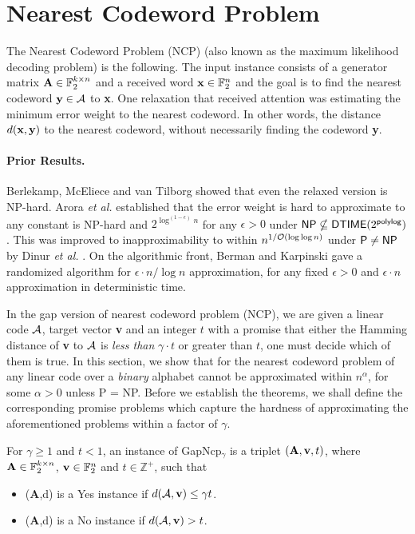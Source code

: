 \section{Nearest Codeword Problem} 

The Nearest Codeword Problem (NCP) (also known as the maximum
likelihood decoding problem) is the following.  The input instance
consists of a generator matrix ${\bf A} \in \mathbb{F}_2^{k \times n}$ and
a received word ${\bf x} \in \mathbb{F}^n_2$ and the goal is to find
the nearest codeword ${\bf y} \in {\cal A}$ to {\bf x}. One relaxation that
received attention was estimating the minimum error weight to the
nearest codeword. In other words, the distance $d({\bf x, y})$ to the
nearest codeword, without necessarily finding the codeword {\bf y}.

\paragraph{Prior Results.} Berlekamp, McEliece and van Tilborg
\cite{BMT} showed that even the relaxed version is {\sf
  NP}-hard. Arora {\em et al.} \cite{ABSS} established that the error
weight is hard to approximate to any constant is {\sf NP}-hard and
$2^{\log^{(1-\epsilon)}n}$ for any $\epsilon > 0$ under ${\sf NP}
\nsubseteq {\sf DTIME}(2^{\sf poly log})$. This was improved to
inapproximability to within $n^{1/{\cal O}(\log\log n)}$ under ${\sf
  P} \ne {\sf NP}$ by Dinur {\em et al.} \cite{DKRS}. On the
algorithmic front, Berman and Karpinski \cite{BK} gave a randomized
algorithm for $\epsilon\cdot n/\log n$ approximation, for any fixed $\epsilon >0$
and $\epsilon \cdot n$ approximation in deterministic time.


In the gap version of nearest codeword problem (NCP), we are given a
linear code {${\cal A}$}, target vector {\bf v} and an integer $t$ with a
promise that either the Hamming distance of {\bf v} to ${\cal A}$ is {\em
  less than} $\gamma \cdot t$ or greater than $t$, one must decide
which of them is true. In this section, we show that for the nearest
codeword problem of any linear code over a {\em binary} alphabet
cannot be approximated within $n^\alpha$, for some $\alpha > 0$ unless
{\sf P = NP}. Before we establish the theorems, we shall define the
corresponding promise problems which capture the hardness of
approximating the aforementioned problems within a factor of $\gamma$.

\begin{definition} For $\gamma \ge 1$ and $t
  < 1$, an instance of {\sc GapNcp}$_\gamma$ is a triplet $({\bf A},
  {\bf v}, t)$, where ${\bf A} \in \mathbb{F}_2^{k\times n}$, ${\bf v}
  \in \mathbb{F}_2^{n}$ and $t \in \mathbb{Z}^+$, such that
 \begin{itemize}
\item ({\bf A},d) is a {\sf Yes} instance if $d({\cal A}, {\bf v}) \le \gamma t$.
\item ({\bf A},d) is a {\sf No} instance if $d({\cal A}, {\bf v}) > t$.
 \end{itemize}
\end{definition}

